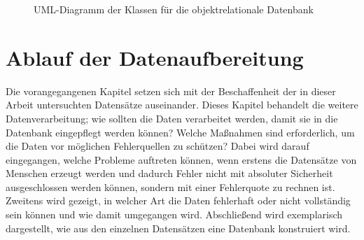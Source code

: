 \begin{figure}
\caption{UML-Diagramm der Klassen für die objektrelationale Datenbank}
\label{fig:uml-database}
\end{figure}

 
\section{Ablauf der Datenaufbereitung} \label{subchap:date-pipeline}

Die vorangegangenen Kapitel setzen sich mit der Beschaffenheit der in dieser Arbeit untersuchten Datensätze auseinander. Dieses Kapitel behandelt die weitere Datenverarbeitung; wie sollten die Daten verarbeitet werden, damit sie in die Datenbank eingepflegt werden können? Welche Maßnahmen sind erforderlich, um die Daten vor möglichen Fehlerquellen zu schützen?
Dabei wird darauf eingegangen, welche Probleme auftreten können, wenn erstens die Datensätze von Menschen erzeugt werden und dadurch Fehler nicht mit absoluter Sicherheit ausgeschlossen werden können, sondern mit einer Fehlerquote zu rechnen ist.
Zweitens wird gezeigt, in welcher Art die Daten fehlerhaft oder nicht vollständig sein können und wie damit umgegangen wird.
Abschließend wird exemplarisch dargestellt, wie aus den einzelnen Datensätzen eine Datenbank konstruiert wird.

